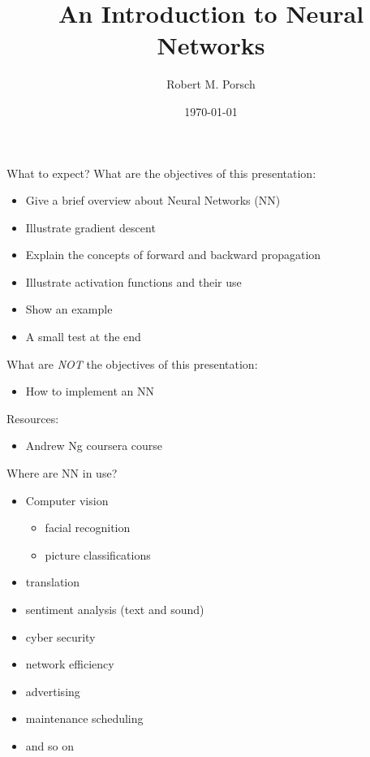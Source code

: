 \documentclass{beamer}
\title{An Introduction to Neural Networks}
\date{\today}
\author{Robert M. Porsch}
\institute{Center for Genomic Science}
\begin{document}
\maketitle

\begin{frame}[t]{What to expect?}
  What are the objectives of this presentation:
  \begin{itemize}
    \item Give a brief overview about Neural Networks (NN)
    \item Illustrate gradient descent
    \item Explain the concepts of forward and backward propagation
    \item Illustrate activation functions and their use
    \item Show an example
    \item A small test at the end
  \end{itemize}
  What are \emph{NOT} the objectives of this presentation:
  \begin{itemize}
    \item How to implement an NN
  \end{itemize}
  Resources:
  \begin{itemize}
    \item Andrew Ng coursera course
  \end{itemize}
\end{frame}

\begin{frame}[t]{Where are NN in use?}
  \begin{itemize}
    \item Computer vision
      \begin{itemize}
        \item facial recognition
        \item picture classifications
      \end{itemize}
      \item translation
      \item sentiment analysis (text and sound)
      \item cyber security
      \item network efficiency
      \item advertising
      \item maintenance scheduling
      \item and so on
  \end{itemize}
\end{frame}
\end{document}
